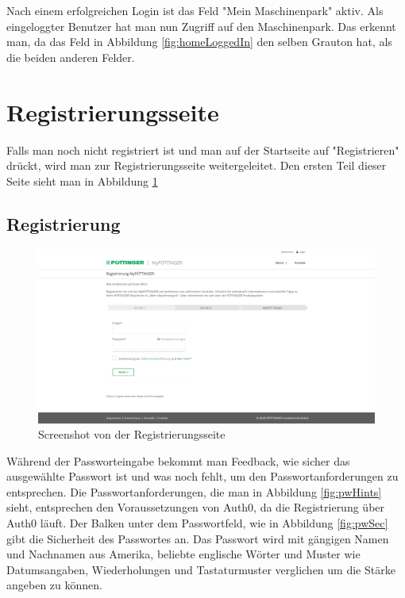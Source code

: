 Nach einem erfolgreichen Login ist das Feld "Mein Maschinenpark" aktiv. Als eingeloggter Benutzer hat man nun Zugriff auf den Maschinenpark. Das erkennt man, da das Feld in Abbildung \ref{fig:homeLoggedIn} den selben Grauton hat, als die beiden anderen Felder. 

\section{Registrierungsseite}

Falls man noch nicht registriert ist und man auf der Startseite auf "Registrieren" drückt, wird man zur Registrierungsseite weitergeleitet. Den ersten Teil dieser Seite sieht man in Abbildung \ref{fig:register}

\subsection{Registrierung}
\begin{figure}[H]
	\centerline{
		\includegraphics[width=1\textwidth, frame]{./grafiken/erm_register.png}
	}
	\vskip0pt
	\caption{Screenshot von der Registrierungsseite} \label{fig:register}
\end{figure}

Während der Passworteingabe bekommt man Feedback, wie sicher das ausgewählte Passwort ist und was noch fehlt, um den Passwortanforderungen zu entsprechen. Die Passwortanforderungen, die man in Abbildung \ref{fig:pwHints} sieht, entsprechen den Voraussetzungen von Auth0, da die Registrierung über Auth0 läuft. Der Balken unter dem Passwortfeld, wie in Abbildung \ref{fig:pwSec} gibt die Sicherheit des Passwortes an. Das Passwort wird mit gängigen Namen und Nachnamen aus Amerika, beliebte englische Wörter und Muster wie Datumsangaben, Wiederholungen und Tastaturmuster verglichen um die Stärke angeben zu können.

